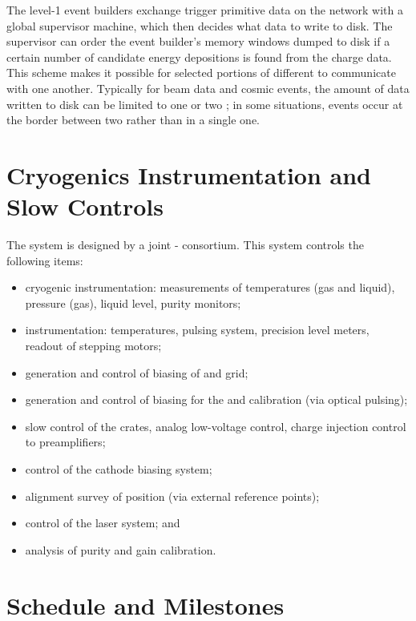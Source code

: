 The level-1 event builders exchange trigger primitive data on the network with a global supervisor machine, which then decides what data to write to disk.  The supervisor can order the event builder's memory  windows dumped to disk if a certain number of candidate energy depositions is found from the charge data.  This scheme makes it possible for selected portions of different  to communicate with one another.  
Typically for beam data and cosmic events, the amount of data written to disk can be limited to one or two ; in some situations, events occur at the border between two  rather than in a single one.


\section{Cryogenics Instrumentation and Slow Controls}
\label{sec:dp-execsum-sc}
The  system is designed by a joint - consortium. 
This system controls the following items:

\begin{itemize}
\item cryogenic instrumentation: measurements of temperatures (gas and liquid), pressure (gas), liquid level, purity monitors;
\item {} instrumentation: temperatures, pulsing system, precision level meters, readout of  stepping motors;
\item generation and control of  biasing of  and grid;
\item generation and control of  biasing for the  and calibration (via optical pulsing);
\item slow control of the  crates, analog  low-voltage control, charge injection control to preamplifiers;
\item control of the cathode  biasing system;
\item alignment survey of  position (via external reference points);
\item control of the laser system; and
\item analysis of  purity and   gain calibration.
\end{itemize}


\section{Schedule and Milestones}
\label{sec:fddp-exec-sched}

